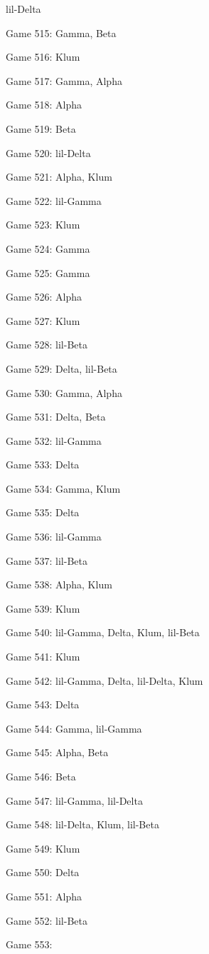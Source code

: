 \documentclass{article}
\begin{document}
\begin{multicols}{3}
\begin{compactitem}
lil-Delta
\item Game 515:
Gamma, Beta
\item Game 516:
Klum
\item Game 517:
Gamma, Alpha
\item Game 518:
Alpha
\item Game 519:
Beta
\item Game 520:
lil-Delta
\item Game 521:
Alpha, Klum
\item Game 522:
lil-Gamma
\item Game 523:
Klum
\item Game 524:
Gamma
\item Game 525:
Gamma
\item Game 526:
Alpha
\item Game 527:
Klum
\item Game 528:
lil-Beta
\item Game 529:
Delta, lil-Beta
\item Game 530:
Gamma, Alpha
\item Game 531:
Delta, Beta
\item Game 532:
lil-Gamma
\item Game 533:
Delta
\item Game 534:
Gamma, Klum
\item Game 535:
Delta
\item Game 536:
lil-Gamma
\item Game 537:
lil-Beta
\item Game 538:
Alpha, Klum
\item Game 539:
Klum
\item Game 540:
lil-Gamma, Delta, Klum, lil-Beta
\item Game 541:
Klum
\item Game 542:
lil-Gamma, Delta, lil-Delta, Klum
\item Game 543:
Delta
\item Game 544:
Gamma, lil-Gamma
\item Game 545:
Alpha, Beta
\item Game 546:
Beta
\item Game 547:
lil-Gamma, lil-Delta
\item Game 548:
lil-Delta, Klum, lil-Beta
\item Game 549:
Klum
\item Game 550:
Delta
\item Game 551:
Alpha
\item Game 552:
lil-Beta
\item Game 553:

\end{compactitem}
\end{multicols}
\end{document}

